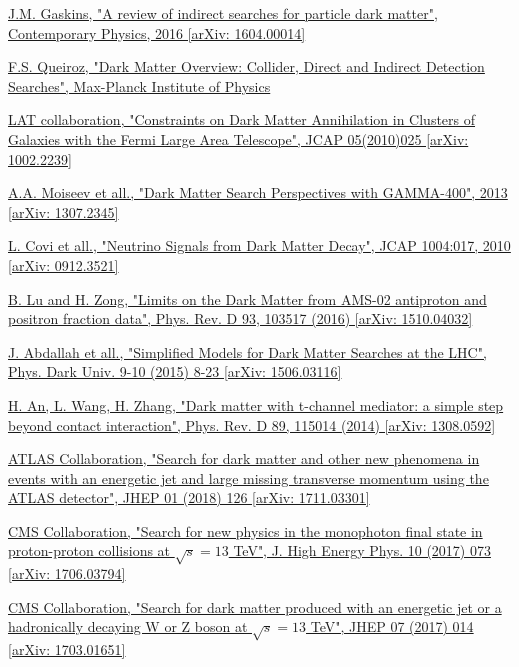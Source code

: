 \documentclass[a4paper, 10pt, openright]{report}
\begin{document}
\begin{thebibliography}{1}
\href{https://arxiv.org/pdf/1604.00014}{J.M. Gaskins,
"A review of indirect searches for particle dark matter",
Contemporary Physics, 2016 [arXiv: 1604.00014]
}

\href{http://inspirehep.net/record/1466249/files/1589812_427-436.pdf}{F.S. Queiroz,
"Dark Matter Overview: Collider, Direct and Indirect Detection Searches",
Max-Planck Institute of Physics
}

\href{https://arxiv.org/pdf/1106.3416.pdf}{LAT collaboration,
"Constraints on Dark Matter Annihilation in Clusters of Galaxies with the Fermi Large Area Telescope",
JCAP 05(2010)025 [arXiv: 1002.2239]
}

\href{https://arxiv.org/abs/1307.2345}{A.A. Moiseev et all.,
"Dark Matter Search Perspectives with GAMMA-400",
2013 [arXiv: 1307.2345]
}

\href{https://arxiv.org/abs/0912.3521}{L. Covi et all.,
"Neutrino Signals from Dark Matter Decay",
JCAP 1004:017, 2010 [arXiv: 0912.3521]
}

\href{https://arxiv.org/abs/1510.04032}{B. Lu and H. Zong,
"Limits on the Dark Matter from AMS-02 antiproton and positron fraction data",
Phys. Rev. D 93, 103517 (2016) [arXiv: 1510.04032]
}

\href{https://arxiv.org/abs/1506.03116}{J. Abdallah et all.,
"Simplified Models for Dark Matter Searches at the LHC",
Phys. Dark Univ. 9-10 (2015) 8-23 [arXiv: 1506.03116]
}

\href{https://arxiv.org/abs/1308.0592}{H. An, L. Wang, H. Zhang,
"Dark matter with t-channel mediator: a simple step beyond contact interaction",
Phys. Rev. D 89, 115014 (2014) [arXiv: 1308.0592]
}

\href{https://arxiv.org/abs/1711.03301}{ATLAS Collaboration,
"Search for dark matter and other new phenomena in events with an energetic jet and large missing transverse momentum using the ATLAS detector",
JHEP 01 (2018) 126 [arXiv: 1711.03301]
}

\href{https://arxiv.org/abs/1706.03794}{CMS Collaboration,
"Search for new physics in the monophoton final state in proton-proton collisions at $\sqrt{s} = 13$ TeV",
J. High Energy Phys. 10 (2017) 073 [arXiv: 1706.03794]
}

\href{https://arxiv.org/abs/1703.01651}{CMS Collaboration,
"Search for dark matter produced with an energetic jet or a hadronically decaying W or Z boson at $\sqrt{s} = 13$ TeV",
JHEP 07 (2017) 014 [arXiv: 1703.01651]
}


\end{thebibliography}
\end{document}
